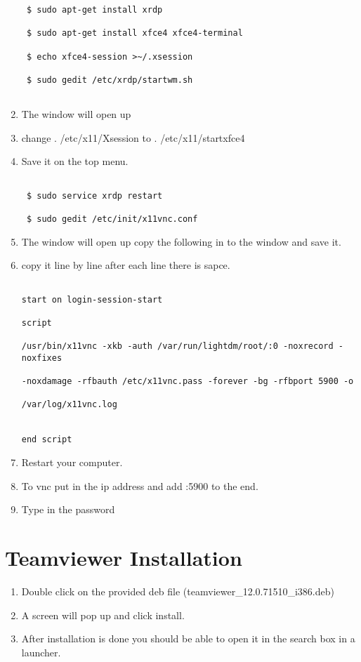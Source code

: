\documentclass[12pt]{article}
\begin{document}
\begin{enumerate}
\begin{lstlisting}
 $ sudo apt-get install xrdp

 $ sudo apt-get install xfce4 xfce4-terminal

 $ echo xfce4-session >~/.xsession

 $ sudo gedit /etc/xrdp/startwm.sh


\end{lstlisting}

     \item The window will open up
     \item change . /etc/x11/Xsession to . /etc/x11/startxfce4
     \item Save it on the top menu.
\begin{lstlisting}

 $ sudo service xrdp restart

 $ sudo gedit /etc/init/x11vnc.conf

\end{lstlisting}
     \item The window will open up copy the following in to the window and save it.
     \item copy it line by line after each line there is sapce.
\begin{lstlisting}

start on login-session-start

script

/usr/bin/x11vnc -xkb -auth /var/run/lightdm/root/:0 -noxrecord -noxfixes

-noxdamage -rfbauth /etc/x11vnc.pass -forever -bg -rfbport 5900 -o

/var/log/x11vnc.log


end script

\end{lstlisting}
     \item Restart your computer.
     \item To vnc put in the ip address and add :5900 to the end.
     \item Type in the password
\end{enumerate}
\newpage
\section{Teamviewer Installation}\label{Teamviewer Installation}
\begin{enumerate}
     \item Double click on the provided deb file (teamviewer\_12.0.71510\_i386.deb)
     \item A screen will pop up and click install.

     \item After installation is done you should be able to open it in the search box in a launcher.
\end{enumerate}
\newpage
\end{document}
